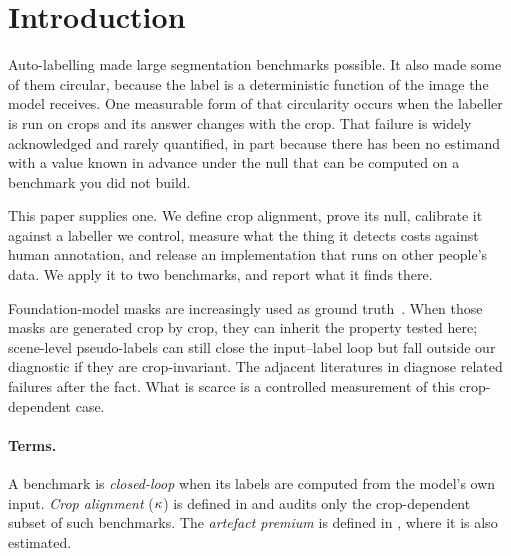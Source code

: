 \section{Introduction}
\label{sec:intro}

Auto-labelling made large segmentation benchmarks possible. It also made some of
them circular, because the label is a deterministic function of the image the model
receives. One measurable form of that circularity occurs when the labeller is run on
crops and its answer changes with the crop. That failure is widely acknowledged and
rarely quantified, in part because there has been no estimand with a value known in
advance under the null that can be computed on a benchmark you did not build.

This paper supplies one. We define crop alignment, prove its null, calibrate it
against a labeller we control, measure what the thing it detects costs against human
annotation, and release an implementation that runs on other people's data. We apply
it to two benchmarks, and  report what it finds there.

Foundation-model masks are increasingly used as ground
truth~\cite{kirillov2023segment}. When those masks are generated crop by crop, they
can inherit the property tested here; scene-level pseudo-labels can still close the
input--label loop but fall outside our diagnostic if they are crop-invariant. The
adjacent literatures in  diagnose related failures after the fact.
What is scarce is a controlled measurement of this crop-dependent case.

\paragraph{Terms.} A benchmark is \emph{closed-loop} when its labels are computed
from the model's own input. \emph{Crop alignment} ($\kappa$) is defined in
 and audits only the crop-dependent subset of such benchmarks. The
\emph{artefact premium} is defined in
, where it is also estimated.
